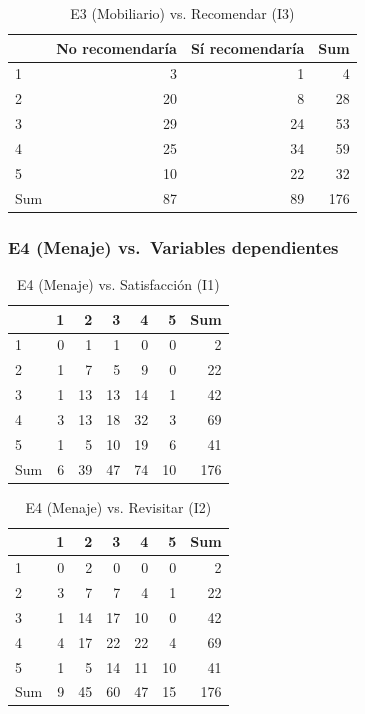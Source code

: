 \documentclass[
  spanish,
]{article}
\begin{document}
\begin{longtable}[t]{lrrr}
\caption{\label{tab:cont-e3-recom}E3 (Mobiliario) vs. Recomendar (I3)}\\
\toprule
 & No recomendaría & Sí recomendaría & Sum\\
\midrule
1 & 3 & 1 & 4\\
2 & 20 & 8 & 28\\
3 & 29 & 24 & 53\\
4 & 25 & 34 & 59\\
5 & 10 & 22 & 32\\
\addlinespace
Sum & 87 & 89 & 176\\
\bottomrule
\end{longtable}

\subsubsection{E4 (Menaje) vs.~Variables
dependientes}\label{e4-menaje-vs.-variables-dependientes}

\begin{longtable}[t]{lrrrrrr}
\caption{\label{tab:cont-e4-satisf}E4 (Menaje) vs. Satisfacción (I1)}\\
\toprule
 & 1 & 2 & 3 & 4 & 5 & Sum\\
\midrule
1 & 0 & 1 & 1 & 0 & 0 & 2\\
2 & 1 & 7 & 5 & 9 & 0 & 22\\
3 & 1 & 13 & 13 & 14 & 1 & 42\\
4 & 3 & 13 & 18 & 32 & 3 & 69\\
5 & 1 & 5 & 10 & 19 & 6 & 41\\
\addlinespace
Sum & 6 & 39 & 47 & 74 & 10 & 176\\
\bottomrule
\end{longtable}

\begin{longtable}[t]{lrrrrrr}
\caption{\label{tab:cont-e4-revis}E4 (Menaje) vs. Revisitar (I2)}\\
\toprule
 & 1 & 2 & 3 & 4 & 5 & Sum\\
\midrule
1 & 0 & 2 & 0 & 0 & 0 & 2\\
2 & 3 & 7 & 7 & 4 & 1 & 22\\
3 & 1 & 14 & 17 & 10 & 0 & 42\\
4 & 4 & 17 & 22 & 22 & 4 & 69\\
5 & 1 & 5 & 14 & 11 & 10 & 41\\
\addlinespace
Sum & 9 & 45 & 60 & 47 & 15 & 176\\
\bottomrule
\end{longtable}
\end{document}
